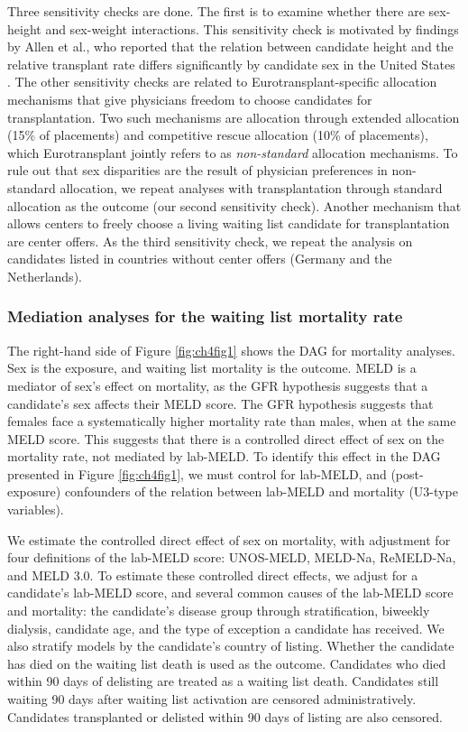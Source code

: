 \documentclass[11pt,twoside,]{book}
\begin{document}
Three sensitivity checks are done. The first is to examine whether
there are sex-height and sex-weight interactions. This sensitivity check is motivated by
findings by Allen et al., who reported that the relation between candidate
height and the relative transplant rate differs significantly by candidate sex
in the United States \citep{allenReducedAccessLiver2018}. The other sensitivity
checks are related to Eurotransplant-specific allocation mechanisms that give physicians freedom to
choose candidates for transplantation. Two such mechanisms are allocation
through extended allocation (15\% of placements) and competitive rescue
allocation (10\% of placements), which Eurotransplant jointly refers to as \emph{non-standard}
allocation mechanisms. To rule out that sex disparities
are the result of physician preferences in non-standard allocation, we
repeat analyses with transplantation through standard allocation as
the outcome (our second sensitivity check). Another mechanism that
allows centers to freely choose a living waiting list candidate for transplantation
are center offers. As the third sensitivity check, we repeat the analysis on candidates listed in
countries without center offers (Germany and the Netherlands).

\newpage

\subsubsection{Mediation analyses for the waiting list mortality rate}\label{CHmediationmrt}

The right-hand side of Figure \ref{fig:ch4fig1} shows the DAG for mortality analyses.
Sex is the exposure, and waiting list mortality is the outcome. MELD is a mediator
of sex's effect on mortality, as the GFR hypothesis suggests that a candidate's
sex affects their MELD score. The GFR hypothesis suggests that females face a
systematically higher mortality rate than males, when at the same MELD score.
This suggests that there is a controlled direct effect of sex on the mortality rate,
not mediated by lab-MELD. To identify this effect in the DAG presented in Figure
\ref{fig:ch4fig1}, we must control for lab-MELD, and (post-exposure)
confounders of the relation between lab-MELD and mortality (U3-type variables).

We estimate the controlled direct effect of sex on mortality, with
adjustment for four definitions of the lab-MELD score: UNOS-MELD, MELD-Na,
ReMELD-Na, and MELD 3.0. To estimate these controlled direct effects,
we adjust for a candidate's lab-MELD score, and several common causes of the
lab-MELD score and mortality: the candidate's disease group through stratification,
biweekly dialysis, candidate age, and the type of exception a candidate has
received. We also stratify models by the candidate's country of listing.
Whether the candidate has died on the waiting list death is used as the outcome.
Candidates who died within 90 days of delisting are treated as a waiting list
death. Candidates still waiting 90 days after waiting list activation are censored
administratively. Candidates transplanted or delisted within 90 days of listing
are also censored.
\end{document}

